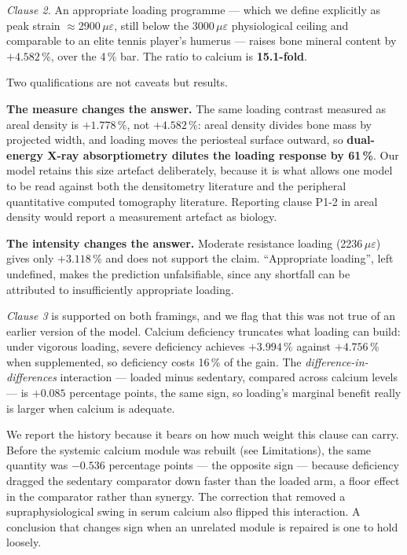 \documentclass[10pt,letterpaper]{article}
\newcommand{\ue}{\ensuremath{\mu\varepsilon}}
\begin{document}
\emph{Clause 2.} An appropriate loading programme --- which we define
explicitly as peak strain $\approx$2900\,\ue, still below the 3000\,\ue{}
physiological ceiling and comparable to an elite tennis player's humerus ---
raises bone mineral content by \textbf{$+4.582\,\%$}, over the 4\,\% bar.
The ratio to calcium is \textbf{15.1-fold}.

Two qualifications are not caveats but results.

\textbf{The measure changes the answer.} The same loading contrast measured as
areal density is $+1.778\,\%$, not $+4.582\,\%$: areal density divides bone
mass by projected width, and loading moves the periosteal surface outward, so
\textbf{dual-energy X-ray absorptiometry dilutes the loading response by
61\,\%}. Our model retains this size artefact deliberately, because it is what
allows one model to be read against both the densitometry literature and the
peripheral quantitative computed tomography literature. Reporting clause P1-2
in areal density would report a measurement artefact as biology.

\textbf{The intensity changes the answer.} Moderate resistance loading
(2236\,\ue) gives only $+3.118\,\%$ and does not support the claim.
``Appropriate loading'', left undefined, makes the prediction unfalsifiable,
since any shortfall can be attributed to insufficiently appropriate loading.

\emph{Clause 3} is supported on both framings, and we flag that this was not
true of an earlier version of the model. Calcium deficiency truncates what
loading can build: under vigorous loading, severe deficiency achieves
$+3.994$\,\% against $+4.756$\,\% when supplemented, so deficiency costs
16\,\% of the gain. The \emph{difference-in-differences} interaction --- loaded
minus sedentary, compared across calcium levels --- is \textbf{$+0.085$}
percentage points, the same sign, so loading's marginal benefit really is larger
when calcium is adequate.

We report the history because it bears on how much weight this clause can carry.
Before the systemic calcium module was rebuilt (see Limitations), the same
quantity was \textbf{$-0.536$} percentage points --- the opposite sign ---
because deficiency dragged the sedentary comparator down faster than the loaded
arm, a floor effect in the comparator rather than synergy. The correction that
removed a supraphysiological swing in serum calcium also flipped this
interaction. A conclusion that changes sign when an unrelated module is repaired
is one to hold loosely.
\end{document}
